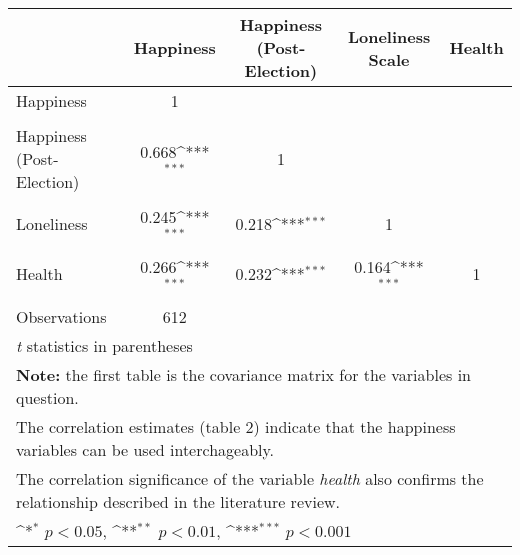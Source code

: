 {
\def\sym#1{\ifmmode^{#1}\else\(^{#1}\)\fi}
\begin{tabular}{l*{4}{c}}
\toprule
                                                  & Happiness         &Happiness (Post-Election)         &Loneliness Scale         &    Health         \\
\midrule
Happiness                                         &         1         &                   &                   &                   \\
                                                  &                   &                   &                   &                   \\
\addlinespace
Happiness (Post-Election)                         &     0.668\sym{***}&         1         &                   &                   \\
                                                  &                   &                   &                   &                   \\
\addlinespace
Loneliness                                        &     0.245\sym{***}&     0.218\sym{***}&         1         &                   \\
                                                  &                   &                   &                   &                   \\
\addlinespace
Health                                            &     0.266\sym{***}&     0.232\sym{***}&     0.164\sym{***}&         1         \\
                                                  &                   &                   &                   &                   \\
\midrule
Observations                                      &       612         &                   &                   &                   \\
\bottomrule
\multicolumn{5}{l}{\footnotesize \textit{t} statistics in parentheses}\\
\multicolumn{5}{l}{\footnotesize \textbf{Note:} the first table is the covariance matrix for the variables in question.}\\
\multicolumn{5}{l}{\footnotesize The correlation estimates (table 2) indicate that the happiness variables can be used interchageably.}\\
\multicolumn{5}{l}{\footnotesize The correlation significance of the variable \emph{health} also confirms the relationship described in the literature review.}\\
\multicolumn{5}{l}{\footnotesize \sym{*} \(p<0.05\), \sym{**} \(p<0.01\), \sym{***} \(p<0.001\)}\\
\end{tabular}
}
